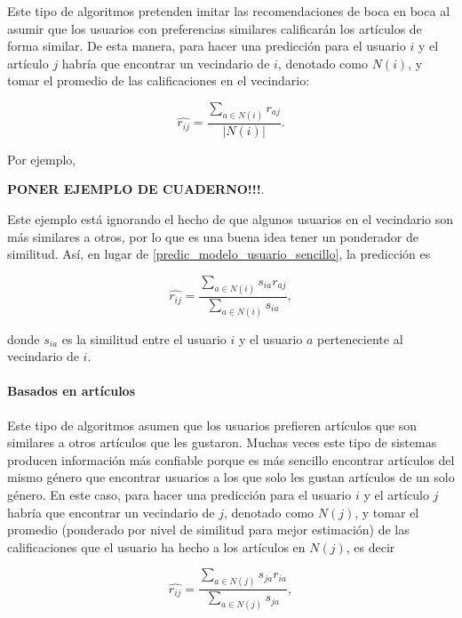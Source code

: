 Este tipo de algoritmos pretenden imitar las recomendaciones de boca en boca al asumir que los usuarios con preferencias similares calificarán los artículos de forma similar. De esta manera, para hacer una predicción para el usuario $i$ y el artículo $j$ habría que encontrar un vecindario de $i$, denotado como $N(i)$, y tomar el promedio de las calificaciones en el vecindario:

\begin{equation}\label{predic_modelo_usuario_sencillo}
 \hat{r_{ij}} = \frac{\sum_{a \in N(i)} r_{aj}}{\vert N(i) \vert}.
\end{equation}

Por ejemplo,

\textbf{PONER EJEMPLO DE CUADERNO!!!}.

Este ejemplo está ignorando el hecho de que algunos usuarios en el vecindario son más similares a otros, por lo que es una buena idea tener un ponderador de similitud. Así, en lugar de \ref{predic_modelo_usuario_sencillo}, la predicción es

\begin{equation}\label{predic_modelo_usuario_ponderado}
 \hat{r_{ij}} = \frac{\sum_{a \in N(i)} s_{ia} r_{aj}}{\sum_{a \in N(i)} s_{ia}},
\end{equation}

donde $s_{ia}$ es la similitud entre el usuario $i$ y el usuario $a$ perteneciente al vecindario de $i$.

\paragraph{Basados en artículos}

Este tipo de algoritmos asumen que los usuarios prefieren artículos que son similares a otros artículos que les gustaron. Muchas veces este tipo de sistemas producen información más confiable porque es más sencillo encontrar artículos del mismo género que encontrar usuarios a los que solo les gustan artículos de un solo género. En este caso, para hacer una predicción para el usuario $i$ y el artículo $j$ habría que encontrar un vecindario de $j$, denotado como $N(j)$, y tomar el promedio (ponderado por nivel de similitud para mejor estimación) de las calificaciones que el usuario ha hecho a los artículos en $N(j)$, es decir

\begin{equation}\label{predic_modelo_articulo_ponderado}
 \hat{r_{ij}} = \frac{\sum_{a \in N(j)} s_{ja} r_{ia}}{\sum_{a \in N(j)} s_{ja}},
\end{equation}

